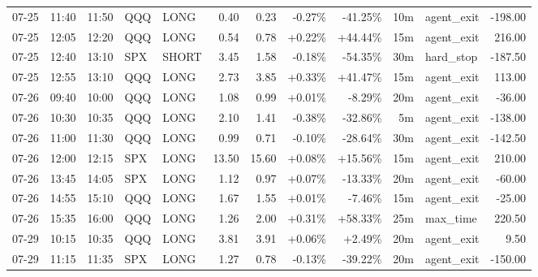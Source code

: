 \documentclass[11pt,a4paper]{article}
\begin{document}
\begin{center}
\begin{longtable}{>{\color{txtmain}}l l l l l r r r r r >{\color{txtmain}}l r}
07-25 & 11:40 & 11:50 & QQQ & LONG & 0.40 & 0.23 & \textcolor{lossred}{-0.27\%} & \textcolor{lossred}{-41.25\%} & 10m & agent\_exit & \textcolor{lossred}{-198.00} \\
07-25 & 12:05 & 12:20 & QQQ & LONG & 0.54 & 0.78 & \textcolor{wingreen}{+0.22\%} & \textcolor{wingreen}{+44.44\%} & 15m & agent\_exit & \textcolor{wingreen}{216.00} \\
07-25 & 12:40 & 13:10 & SPX & SHORT & 3.45 & 1.58 & \textcolor{lossred}{-0.18\%} & \textcolor{lossred}{-54.35\%} & 30m & hard\_stop & \textcolor{lossred}{-187.50} \\
07-25 & 12:55 & 13:10 & QQQ & LONG & 2.73 & 3.85 & \textcolor{wingreen}{+0.33\%} & \textcolor{wingreen}{+41.47\%} & 15m & agent\_exit & \textcolor{wingreen}{113.00} \\
07-26 & 09:40 & 10:00 & QQQ & LONG & 1.08 & 0.99 & \textcolor{wingreen}{+0.01\%} & \textcolor{lossred}{-8.29\%} & 20m & agent\_exit & \textcolor{lossred}{-36.00} \\
07-26 & 10:30 & 10:35 & QQQ & LONG & 2.10 & 1.41 & \textcolor{lossred}{-0.38\%} & \textcolor{lossred}{-32.86\%} & 5m & agent\_exit & \textcolor{lossred}{-138.00} \\
07-26 & 11:00 & 11:30 & QQQ & LONG & 0.99 & 0.71 & \textcolor{lossred}{-0.10\%} & \textcolor{lossred}{-28.64\%} & 30m & agent\_exit & \textcolor{lossred}{-142.50} \\
07-26 & 12:00 & 12:15 & SPX & LONG & 13.50 & 15.60 & \textcolor{wingreen}{+0.08\%} & \textcolor{wingreen}{+15.56\%} & 15m & agent\_exit & \textcolor{wingreen}{210.00} \\
07-26 & 13:45 & 14:05 & SPX & LONG & 1.12 & 0.97 & \textcolor{wingreen}{+0.07\%} & \textcolor{lossred}{-13.33\%} & 20m & agent\_exit & \textcolor{lossred}{-60.00} \\
07-26 & 14:55 & 15:10 & QQQ & LONG & 1.67 & 1.55 & \textcolor{wingreen}{+0.01\%} & \textcolor{lossred}{-7.46\%} & 15m & agent\_exit & \textcolor{lossred}{-25.00} \\
07-26 & 15:35 & 16:00 & QQQ & LONG & 1.26 & 2.00 & \textcolor{wingreen}{+0.31\%} & \textcolor{wingreen}{+58.33\%} & 25m & max\_time & \textcolor{wingreen}{220.50} \\
07-29 & 10:15 & 10:35 & QQQ & LONG & 3.81 & 3.91 & \textcolor{wingreen}{+0.06\%} & \textcolor{wingreen}{+2.49\%} & 20m & agent\_exit & \textcolor{wingreen}{9.50} \\
07-29 & 11:15 & 11:35 & SPX & LONG & 1.27 & 0.78 & \textcolor{lossred}{-0.13\%} & \textcolor{lossred}{-39.22\%} & 20m & agent\_exit & \textcolor{lossred}{-150.00} \\

\end{longtable}
\end{center}
\end{document}
